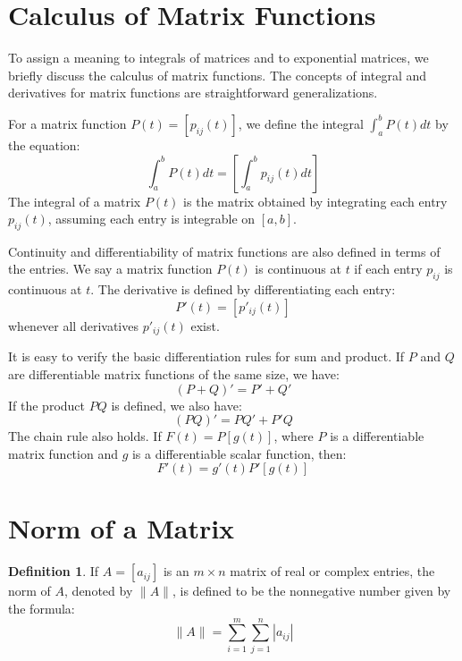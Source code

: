 \documentclass[12pt,a4paper]{report}
\theoremstyle{definition}
\newtheorem{definition}[theorem]{Definition}
\numberwithin{equation}{chapter}
\begin{document}
\section{Calculus of Matrix Functions}
To assign a meaning to integrals of matrices and to exponential matrices, we briefly discuss the calculus of matrix functions. The concepts of integral and derivatives for matrix functions are straightforward generalizations.

For a matrix function $P(t) = [p_{ij}(t)]$, we define the integral $\int_a^b P(t)dt$ by the equation:
\begin{equation}
\int_a^b P(t)dt = \left[ \int_a^b p_{ij}(t)dt \right]
\end{equation}
The integral of a matrix $P(t)$ is the matrix obtained by integrating each entry $p_{ij}(t)$, assuming each entry is integrable on $[a, b]$.

Continuity and differentiability of matrix functions are also defined in terms of the entries. We say a matrix function $P(t)$ is continuous at $t$ if each entry $p_{ij}$ is continuous at $t$. The derivative is defined by differentiating each entry:
\begin{equation}
P'(t) = [p'_{ij}(t)]
\end{equation}
whenever all derivatives $p'_{ij}(t)$ exist.

It is easy to verify the basic differentiation rules for sum and product. If $P$ and $Q$ are differentiable matrix functions of the same size, we have:
\begin{equation}
(P + Q)' = P' + Q'
\end{equation}
If the product $PQ$ is defined, we also have:
\begin{equation}
(PQ)' = PQ' + P'Q
\end{equation}
The chain rule also holds. If $F(t) = P[g(t)]$, where $P$ is a differentiable matrix function and $g$ is a differentiable scalar function, then:
\begin{equation}
F'(t) = g'(t)P'[g(t)]
\end{equation}

\section{Norm of a Matrix}
\begin{definition}
If $A = [a_{ij}]$ is an $m \times n$ matrix of real or complex entries, the norm of $A$, denoted by $\|A\|$, is defined to be the nonnegative number given by the formula:
\begin{equation}
\|A\| = \sum_{i=1}^m \sum_{j=1}^n |a_{ij}|
\end{equation}
\end{definition}
\end{document}
